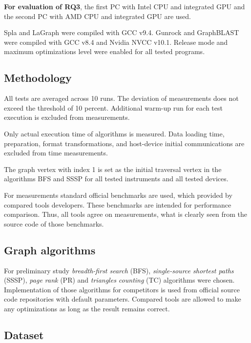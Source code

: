 \textbf{For evaluation of RQ3}, the first PC with Intel CPU and integrated GPU and the second PC with AMD CPU and integrated GPU are used.

Spla and LaGraph were compiled with GCC v9.4. Gunrock and GraphBLAST were compiled with GCC v8.4 and Nvidia NVCC v10.1.
Release mode and maximum optimizations level were enabled for all tested programs. 

\subsection{Methodology}

All tests are averaged across 10 runs. The deviation of measurements does not exceed the threshold of 10 percent. Additional warm-up run for each test execution is excluded from measurements. 

Only actual execution time of algorithms is measured. Data loading time, preparation, format transformations, and host-device initial communications are excluded from time measurements. 

The graph vertex with index 1 is set as the initial traversal vertex in the algorithms BFS and SSSP for all tested instruments and all tested devices.

For measurements standard official benchmarks are used, which provided by compared tools developers. These benchmarks are intended for performance comparison. Thus, all tools agree on measurements, what is clearly seen from the source code of those benchmarks.

\subsection{Graph algorithms}

For preliminary study \textit{breadth-first search} (BFS), \textit{single-source shortest paths} (SSSP), \textit{page rank} (PR) and \textit{triangles counting} (TC) algorithms were chosen.
Implementation of those algorithms for competitors is used from official source code repositories with default parameters. Compared tools are allowed to make any optimizations as long as the result remains correct.

\subsection{Dataset}

